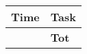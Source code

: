 \begin{center}
    {\renewcommand{\arraystretch}{2}%
    \begin{tabular}{L{2cm}L{12cm}}
        \hline
        \textbf{Time} & \textbf{Task} \\
        \hline
        \textbf{} & \textbf{Tot} \\
    \end{tabular}}
\end{center}